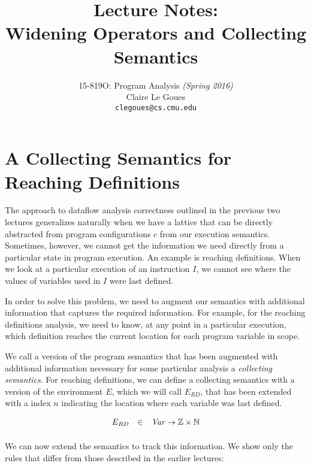 \documentclass[11pt]{article}
\title{Lecture Notes:\\
		Widening Operators and Collecting Semantics}
\author{15-819O: Program Analysis \emph{(Spring 2016)} \\
        Claire Le Goues \\
		{\tt clegoues@cs.cmu.edu}}
\date{}
\def\Natural{\mathbb{N}}
\def\Integer{\mathbb{Z}}
\begin{document}
\begin{sloppypar}
\newtheorem{theorem}{Theorem}
\newtheorem{lemma}[theorem]{Lemma}

\maketitle


\section{A Collecting Semantics for Reaching Definitions}

The approach to dataflow analysis correctness outlined in the previous two lectures generalizes naturally when we have a lattice that can be directly abstracted from program configurations $c$ from our execution semantics.  Sometimes, however, we cannot get the information we need directly from a particular state in program execution.  An example is reaching definitions.  When we look at a particular execution of an instruction $I$, we cannot see where the values of variables used in $I$ were last defined.

In order to solve this problem, we need to augment our semantics with additional information that captures the required information.  For example, for the reaching definitions analysis, we need to know, at any point in a particular execution, which definition reaches the current location for each program variable in scope.

We call a version of the program semantics that has been augmented with additional information necessary for some particular analysis a \textit{collecting semantics}.  For reaching definitions, we can define a collecting semantics with a version of the environment $E$, which we will call $E_{RD}$, that has been extended with a index $n$ indicating the location where each variable was last defined.

\[
\begin{array}{lll}

E_{RD} & \in & \textit{Var} \rightarrow \Integer \cross \Natural \\[1ex]

\end{array}
\]

We can now extend the semantics to track this information.  We show only the rules that differ from those described in the earlier lectures:

\[
\begin{array}{c}


\end{array}\]
\end{sloppypar}
\end{document}
